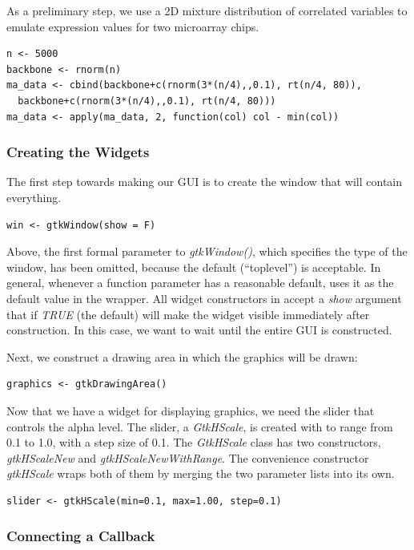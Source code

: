 \documentclass[article]{jss}
\begin{document}
As a preliminary step, we use a 2D mixture distribution of correlated variables
to emulate expression values for two microarray chips. 
\begin{verbatim}
n <- 5000
backbone <- rnorm(n)
ma_data <- cbind(backbone+c(rnorm(3*(n/4),,0.1), rt(n/4, 80)), 
  backbone+c(rnorm(3*(n/4),,0.1), rt(n/4, 80)))
ma_data <- apply(ma_data, 2, function(col) col - min(col))
\end{verbatim}

\subsubsection{Creating the Widgets}

The first step towards making our GUI is to create the window that
will contain everything. 
\begin{verbatim}
win <- gtkWindow(show = F)
\end{verbatim}

Above, the first formal parameter to \emph{gtkWindow()}, which specifies the
type of the window, has been omitted, because the default (``toplevel'') is acceptable.  
In general, whenever a function parameter
has a reasonable default,  uses it as the default value in the
 wrapper. All widget constructors
in  accept a \emph{show} argument that if \emph{TRUE} (the default)
will make the widget visible immediately after construction.
In this case, we want to wait until the entire GUI is constructed. 

Next, we construct a drawing area in which the  graphics will be
drawn:
\begin{verbatim}
graphics <- gtkDrawingArea()
\end{verbatim}

Now that we have a widget for displaying  graphics, we need the slider
that controls the alpha level. The slider, a \emph{GtkHScale}, is created
with to range from 0.1 to 1.0, with a step size of 0.1. The \emph{GtkHScale}
class has two constructors, \emph{gtkHScaleNew} and \emph{gtkHScaleNewWithRange}.
The convenience constructor \emph{gtkHScale} wraps both of them by
merging the two parameter lists into its own.
\begin{verbatim}
slider <- gtkHScale(min=0.1, max=1.00, step=0.1)
\end{verbatim}

\subsubsection{Connecting a Callback}
\end{document}

